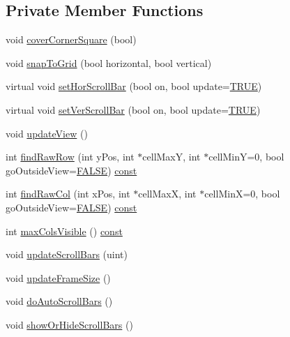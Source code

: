 \subsection*{Private Member Functions}
\begin{DoxyCompactItemize}
\item 
void \hyperlink{classQtTableView_afbc9eed1c49a4d520dfdca3a619fd511}{cover\+Corner\+Square} (bool)
\item 
void \hyperlink{classQtTableView_afe9ee24887e053080e40169a9ade9ab5}{snap\+To\+Grid} (bool horizontal, bool vertical)
\item 
virtual void \hyperlink{classQtTableView_a302568ab16c504145357097e8a0b50e6}{set\+Hor\+Scroll\+Bar} (bool on, bool update=\hyperlink{xpm2img_8c_aa8cecfc5c5c054d2875c03e77b7be15d}{T\+R\+U\+E})
\item 
virtual void \hyperlink{classQtTableView_a541f2adfc1ec715bc80000d25a767046}{set\+Ver\+Scroll\+Bar} (bool on, bool update=\hyperlink{xpm2img_8c_aa8cecfc5c5c054d2875c03e77b7be15d}{T\+R\+U\+E})
\item 
void \hyperlink{classQtTableView_a1572557e745a420002dee3ae5abf3896}{update\+View} ()
\item 
int \hyperlink{classQtTableView_a40a0499d06c36c46f1407ff6da3a429b}{find\+Raw\+Row} (int y\+Pos, int $\ast$cell\+Max\+Y, int $\ast$cell\+Min\+Y=0, bool go\+Outside\+View=\hyperlink{xpm2img_8c_aa93f0eb578d23995850d61f7d61c55c1}{F\+A\+L\+S\+E}) \hyperlink{tradstdc_8h_a2c212835823e3c54a8ab6d95c652660e}{const} 
\item 
int \hyperlink{classQtTableView_ae63d99f7f7463ece77758e07994d4348}{find\+Raw\+Col} (int x\+Pos, int $\ast$cell\+Max\+X, int $\ast$cell\+Min\+X=0, bool go\+Outside\+View=\hyperlink{xpm2img_8c_aa93f0eb578d23995850d61f7d61c55c1}{F\+A\+L\+S\+E}) \hyperlink{tradstdc_8h_a2c212835823e3c54a8ab6d95c652660e}{const} 
\item 
int \hyperlink{classQtTableView_a81af3a5aa29ef9f0a3d24251db2447b2}{max\+Cols\+Visible} () \hyperlink{tradstdc_8h_a2c212835823e3c54a8ab6d95c652660e}{const} 
\item 
void \hyperlink{classQtTableView_a7e6b95f3431e6a40f8e335c4a0ca65cb}{update\+Scroll\+Bars} (uint)
\item 
void \hyperlink{classQtTableView_a1835d2c3c5b8db080d68aa7332bd4cab}{update\+Frame\+Size} ()
\item 
void \hyperlink{classQtTableView_ab76f81062e85cb193066868052ddcc97}{do\+Auto\+Scroll\+Bars} ()
\item 
void \hyperlink{classQtTableView_aad6986e3c32fa937b25503d122ecb3dc}{show\+Or\+Hide\+Scroll\+Bars} ()
\end{DoxyCompactItemize}
